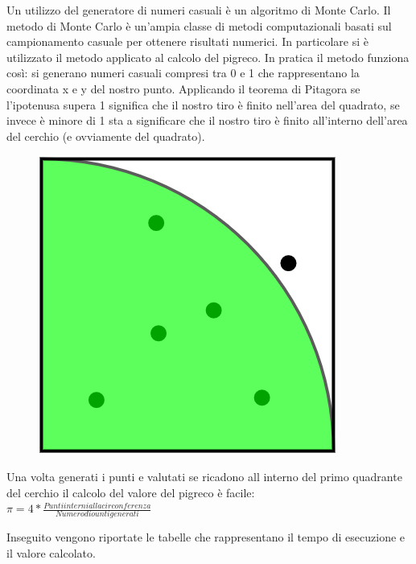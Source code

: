 \documentclass[12pt,a4paper]{report}
\begin{document}
Un utilizzo del generatore di numeri casuali è un algoritmo di Monte Carlo. Il metodo di Monte Carlo è un'ampia classe di metodi computazionali basati sul campionamento casuale per ottenere risultati numerici.  In particolare si è utilizzato il metodo applicato al calcolo del pigreco.
In pratica il metodo funziona così: si generano numeri casuali compresi tra 0 e 1 che rappresentano la coordinata x e y del nostro punto. Applicando il teorema di Pitagora se l’ipotenusa supera 1 significa che il nostro tiro è finito nell’area del quadrato, se invece è minore di 1 sta a significare che il nostro tiro è finito all’interno dell’area del cerchio (e ovviamente del quadrato). 


\begin{figure}[h]
\centering
\includegraphics[scale=0.3]{Img/qCirc.png}
\end{figure}
Una volta generati i punti e valutati se ricadono all interno del primo quadrante del cerchio il calcolo del valore del pigreco è facile: \\

\vspace{1cm}
$ \pi = 4 * \frac{Punti interni alla circonferenza}{Numero di ounti generati} $ 

	

Inseguito vengono riportate le tabelle che rappresentano il tempo di esecuzione e il valore calcolato.
\end{document}

